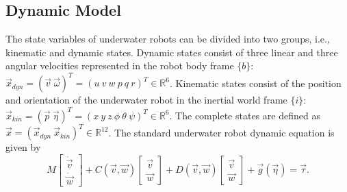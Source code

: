 \subsection{Dynamic Model}
The state variables of underwater robots can be divided into two groups, i.e., kinematic and dynamic states. Dynamic states consist of three linear and three angular velocities represented in the robot body frame $\lbrace b \rbrace$: $\vec{x}_{dyn}=(\vec{v}~\vec{\omega})^{T}=(u~v~w~p~q~r)^{T} \in \mathbb{R}^{6}$. Kinematic states consist of the position and orientation of the underwater robot in the inertial world frame $\lbrace i \rbrace$: $\vec{x}_{kin}=(\vec{p}~\vec{\eta})^{T}
=(x~y~z~\phi~\theta~\psi)^{T} \in \mathbb{R}^{6}$. The complete states are defined as $\vec{x}=(\vec{x}_{dyn}~\vec{x}_{kin})^{T} \in \mathbb{R}^{12}$. 
The standard underwater robot dynamic equation is given by
\begin{equation}
M\begin{bmatrix}
\dot{\vec{v}} \\
\dot{\vec{w}}
\end{bmatrix}+
C(\vec{v},\vec{w})\begin{bmatrix}
\vec{v} \\
\vec{w}
\end{bmatrix}+
D(\vec{v},\vec{w})\begin{bmatrix}
\vec{v}\\
\vec{w}
\end{bmatrix}+\vec{g}(\vec{\eta})=\vec{\tau}. \label{EQ:RobotDynamics}
\end{equation}

